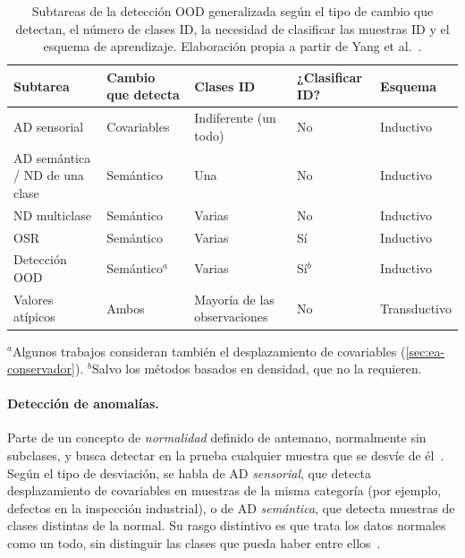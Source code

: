 \begin{table}[tbp]
  \centering
  \small
  \caption{Subtareas de la detección OOD generalizada según el tipo de cambio que
    detectan, el número de clases ID, la necesidad de clasificar las muestras ID y
    el esquema de aprendizaje. Elaboración propia a partir de Yang et
    al.~\cite{yang2024}.}
  \label{tab:ea-taxonomia}
  \begin{tabularx}{\textwidth}{@{}>{\raggedright\arraybackslash}X>{\raggedright\arraybackslash}p{}>{\raggedright\arraybackslash}p{}>{\raggedright\arraybackslash}p{}>{\raggedright\arraybackslash}p{}@{}}
    \toprule
    \textbf{Subtarea} & \textbf{Cambio que detecta} & \textbf{Clases ID} & \textbf{¿Clasificar ID?} & \textbf{Esquema} \\
    \midrule
    AD sensorial & Covariables & Indiferente (un todo) & No & Inductivo \\
    AD semántica / ND de una clase & Semántico & Una & No & Inductivo \\
    ND multiclase & Semántico & Varias & No & Inductivo \\
    OSR & Semántico & Varias & Sí & Inductivo \\
    Detección OOD & Semántico$^{a}$ & Varias & Sí$^{b}$ & Inductivo \\
    Valores atípicos & Ambos & Mayoría de las observaciones & No & Transductivo \\
    \bottomrule
  \end{tabularx}

  \smallskip
  {\footnotesize $^{a}$Algunos trabajos consideran también el desplazamiento de
  covariables (\cref{sec:ea-conservador}). $^{b}$Salvo los métodos basados en
  densidad, que no la requieren.}
\end{table}

\paragraph{Detección de anomalías.} Parte de un concepto de \emph{normalidad}
definido de antemano, normalmente sin subclases, y busca detectar en la prueba
cualquier muestra que se desvíe de él~\cite{yang2024}. Según el tipo de
desviación, se habla de AD \emph{sensorial}, que detecta desplazamiento de
covariables en muestras de la misma categoría (por ejemplo, defectos en la
inspección industrial), o de AD \emph{semántica}, que detecta muestras de clases
distintas de la normal. Su rasgo distintivo es que trata los datos normales como
un todo, sin distinguir las clases que pueda haber entre ellos~\cite{yang2024}.

